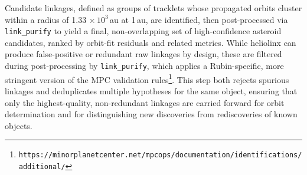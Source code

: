 Candidate linkages, defined as groups of tracklets whose propagated orbits cluster within a radius of 1.33 $\times\,10^{3}$\,au at 1\,au,
are identified, then post-processed via \texttt{link\_purify} to yield a final, non‐overlapping set of high-confidence asteroid candidates, ranked by orbit-fit residuals and related metrics.
While heliolinx can produce false-positive or redundant raw linkages by design, these are filtered during post-processing by \texttt{link\_purify}, which applies a Rubin-specific, more stringent version of the MPC validation rules\footnote{\nolinkurl{https://minorplanetcenter.net/mpcops/documentation/identifications/additional/}}.
This step both rejects spurious linkages and deduplicates multiple hypotheses for the same object, ensuring that only the highest-quality, non-redundant linkages are carried forward for orbit determination and for distinguishing new discoveries from rediscoveries of known objects.
